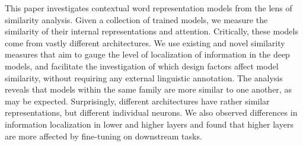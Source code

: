 This paper investigates contextual word representation models from the lens of similarity analysis. Given a collection of trained models, we measure the similarity of their internal representations and attention. Critically, these models come from  vastly different architectures. We use existing and novel similarity measures that aim to gauge the level of localization of information in the deep models, and facilitate the investigation of which design factors affect model similarity, without requiring any external linguistic annotation.  The analysis reveals that  models within the same family are more similar to one another, as may be expected. Surprisingly, different architectures  have rather similar representations, but different individual neurons. We also observed differences in information localization in lower and higher layers and found that higher layers are more affected by fine-tuning on downstream tasks.
